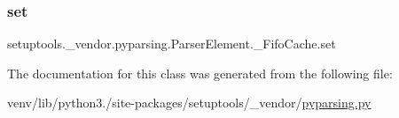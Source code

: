 \subsubsection{\texorpdfstring{set}{set}}
{\footnotesize\ttfamily setuptools.\+\_\+vendor.\+pyparsing.\+Parser\+Element.\+\_\+\+Fifo\+Cache.\+set}



The documentation for this class was generated from the following file\+:\begin{DoxyCompactItemize}
\item 
venv/lib/python3./site-\/packages/setuptools/\+\_\+vendor/\hyperlink{setuptools_2__vendor_2pyparsing_8py}{pyparsing.\+py}\end{DoxyCompactItemize}
